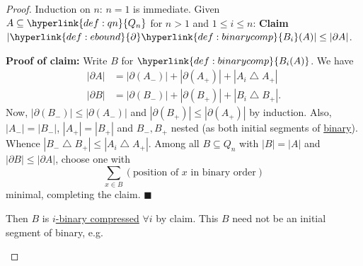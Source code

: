 \documentclass{article}
\newcommand{\sym}{\bigtriangleup}
\let\subset\subseteq
\begin{document}
\begin{proof}
  Induction on $n$: $n=1$ is immediate.
  Given $A \subset \hyperlink{def:qn}{Q_n}$ for $n > 1$ and $1 \leq i \leq n$:
  \textbf{Claim} $|\hyperlink{def:ebound}{\partial} \hyperlink{def:binarycomp}{B_i}(A)| \leq |\partial A|$.

  \textbf{Proof of claim:} Write $B$ for $\hyperlink{def:binarycomp}{B_i(A)}$.
  We have
  \begin{align*}
    |\partial A| &= |\partial(A_-)| + |\partial(A_+)| + |A_i \sym A_+| \\
    |\partial B| &= |\partial(B_-)| + |\partial(B_+)| + |B_i \sym B_+|.
  \end{align*}
  Now, $|\partial (B_-)| \leq |\partial (A_-)|$ and $|\partial(B_+)| \leq |\partial(A_+)|$ by induction.
  Also, $|A_-| = |B_-|$, $|A_+| = |B_+|$ and $B_-, B_+$ nested (as both initial segments of \hyperlink{def:binary}{binary}).
  Whence $|B_- \sym B_+| \leq |A_i \sym A_+|$.
  Among all $B \subset Q_n$ with $|B| = |A|$ and $|\partial B| \leq |\partial A|$, choose one with
  \begin{equation*}\sum_{x \in B} (\text{position of $x$ in binary order})\end{equation*}
  minimal, completing the claim. $\blacksquare$

  Then $B$ is \hyperlink{def:binarycomp}{$i$-binary compressed} $\forall i$ by claim.
  This $B$ need not be an initial segment of binary, e.g.\
  \begin{center}
  \end{center}


\end{proof}
\end{document}
